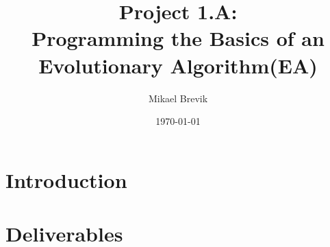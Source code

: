 \documentclass[a4paper, 11pt]{report}
\title{Project 1.A: \\ Programming the Basics of an \\ Evolutionary Algorithm(EA)}
\author{Mikael Brevik}
\date{\today}
\begin{document}
\maketitle
\tableofcontents


\chapter{Introduction}


\chapter{Deliverables}	





\end{document}
